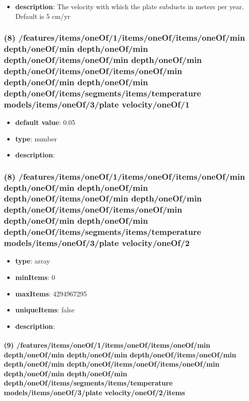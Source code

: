 \begin{itemize}[leftmargin=7em]\item {\bf description}: The velocity with which the plate subducts in meters per year. Default is 5 cm/yr
\end{itemize}
\subsubsection{(8) /features/items/oneOf/1/items/oneOf/items/oneOf/min depth/oneOf/min depth/oneOf/min depth/oneOf/items/oneOf/min depth/oneOf/min depth/oneOf/items/oneOf/items/oneOf/min depth/oneOf/min depth/oneOf/min depth/oneOf/items/segments/items/temperature models/items/oneOf/3/plate velocity/oneOf/1}
\begin{itemize}[leftmargin=8em]\item {\bf default value}: 0.05
\item {\bf type}: number
\item {\bf description}: 
\end{itemize}\subsubsection{(8) /features/items/oneOf/1/items/oneOf/items/oneOf/min depth/oneOf/min depth/oneOf/min depth/oneOf/items/oneOf/min depth/oneOf/min depth/oneOf/items/oneOf/items/oneOf/min depth/oneOf/min depth/oneOf/min depth/oneOf/items/segments/items/temperature models/items/oneOf/3/plate velocity/oneOf/2}
\begin{itemize}[leftmargin=8em]\item {\bf type}: array
\item {\bf minItems}: 0
\item {\bf maxItems}: 4294967295
\item {\bf uniqueItems}: false
\item {\bf description}: 
\end{itemize}\paragraph{(9) /features/items/oneOf/1/items/oneOf/items/oneOf/min depth/oneOf/min depth/oneOf/min depth/oneOf/items/oneOf/min depth/oneOf/min depth/oneOf/items/oneOf/items/oneOf/min depth/oneOf/min depth/oneOf/min depth/oneOf/items/segments/items/temperature models/items/oneOf/3/plate velocity/oneOf/2/items}

